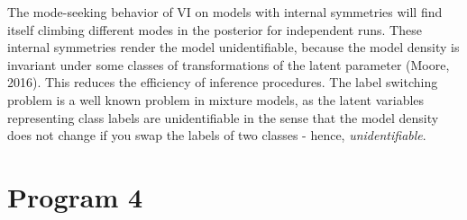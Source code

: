 \documentclass[10pt]{homeworg}
\begin{document}
The mode-seeking behavior of VI on models with internal symmetries will find itself climbing different modes in the posterior for independent runs. These internal symmetries render the model unidentifiable, because the model density is invariant under some classes of transformations of the latent parameter (Moore, 2016). This reduces the efficiency of inference procedures. The label switching problem is a well known problem in mixture models, as the latent variables representing class labels are unidentifiable in the sense that the model density does not change if you swap the labels of two classes - hence, \textit{unidentifiable}.



\section*{Program 4}
\end{document}
